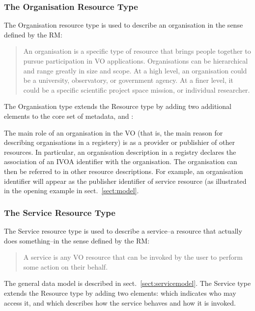 \documentclass[11pt,a4paper]{ivoa}
\begin{document}
\subsubsection{The Organisation Resource Type}


The Organisation resource type is used to describe an organisation in
the sense defined by the RM:


\begin{quotation}
An organisation is a specific type of resource that brings people
together to pursue participation in VO applications.  Organisations
can be hierarchical and range greatly in size and scope.  At a high
level, an organisation could be a university, observatory, or
government agency.  At a finer level, it could be a specific
scientific project space mission, or individual researcher.  
\end{quotation}


The Organisation type extends the Resource type by adding two additional
elements to the core set of metadata,  and
:



The main role of an organisation in the VO (that is, the main reason
for describing organisations in a registery) is as a provider or
publishier of other resources.  In particular, an organisation
description in a registry declares the association of an IVOA
identifier with the organisation.  The
organisation can then be referred to in other resource descriptions.
For example, an organisation identifier will appear as the publisher
identifier of service resource (as illustrated in the opening
example in sect.~\ref{sect:model}.


\subsubsection{The Service Resource Type}


The Service resource type is used to describe a service--a resource
that actually does something--in the sense defined by the
RM:

\begin{quotation}
A service is any VO resource that can be invoked by the user to
perform some action on their behalf.  
\end{quotation}


The general data model is described in sect.~\ref{sect:servicemodel}.
The Service type extends the Resource type by adding two elements:
 which indicates who may access it, and
 which describes how the service behaves and how it is
invoked.
\end{document}
